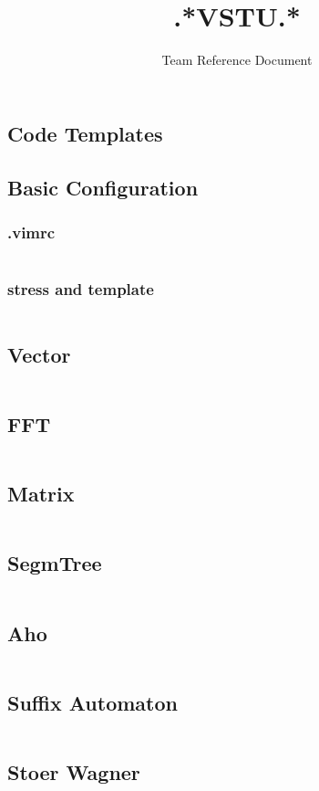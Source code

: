 \documentclass[11.5pt,a4paper,landscape,oneside]{amsart}
\title{.*VSTU.*}
\subtitle{Team Reference Document}
\date{\ddmmyyyydate{\today{}}}
\newcommand{\bashcode}[1]{\inputminted{bash}{code/#1}}
\newcommand{\regcode}[1]{\inputminted[xleftmargin=2em,linenos]{cpp}{code/#1}}
\begin{document}
\begin{multicols*}{2}
\maketitle
\thispagestyle{fancy}
\vspace{-3em}

\tableofcontents
\clearpage

\section{Code Templates}
	\subsection{Basic Configuration}
		\subsubsection{.vimrc}
			\bashcode{vimrc.sh}
		\subsubsection{stress and template}
			\regcode{main.cpp}
	\subsection{Vector}
		\regcode{vec.cpp}
	\subsection{FFT}
		\regcode{fft.cpp}
	\subsection{Matrix}
		\regcode{matrix.cpp}
	\subsection{SegmTree}
		\regcode{segm_tree.cpp}
	\subsection{Aho}
		\regcode{aho.cpp}
	\subsection{Suffix Automaton}
		\regcode{suf_auto.cpp}
	\subsection{Stoer Wagner}
		\regcode{stoer_wagner_mincut.cpp}

\end{multicols*}
\end{document}

